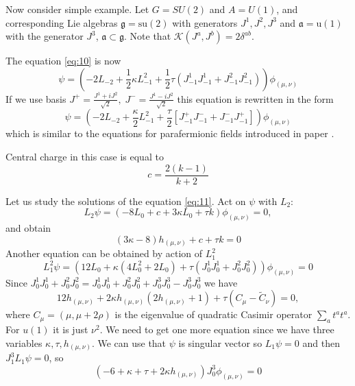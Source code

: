 \documentclass[a4paper]{article}
\theoremstyle{definition}
\newcommand{\gf}{\mathfrak{g}}
\newcommand{\af}{\mathfrak{a}}
\theoremstyle{definition} \newtheorem{Def}{Definition}
\begin{document}
Now consider simple example. Let $G=SU(2)$ and $A=U(1)$, and corresponding Lie algebras
$\gf=\mathrm{su}(2)$ with generators $J^{1},J^{2},J^{3}$ and $\af=\mathrm{u}(1)$ with the generator
$J^{3}$, $\af\subset\gf$. Note that $\mathcal{K}(J^{a},J^{b})=2\delta^{ab}$.

 The equation \eqref{eq:10} is now
\begin{equation}
  \label{eq:11} \psi=\left(-2L_{-2}+\frac{1}{2}\kappa L_{-1}^{2}+\frac{1}{2}\tau
\left(J^{1}_{-1}J^{1}_{-1}+J^{2}_{-1}J^{2}_{-1}\right)\right) \phi_{(\mu,\nu)}
\end{equation}
 If we use basis $J^{+}=\frac{J^{1}+iJ^{2}}{\sqrt{2}},\;
J^{-}=\frac{J^{1}-iJ^{2}}{\sqrt{2}}$ this equation is rewritten in the form
\begin{equation} \psi= \left(-2
L_{-2}+\frac{\kappa}{2}L_{-1}^{2}+\frac{\tau}{2}\left[J^{+}_{-1}J^{-}_{-1}+J^{-}_{-1}J^{+}_{-1}\right]\right)
\phi_{(\mu,\nu)}
\label{eq:12}
\end{equation}
 which is similar to the equations for parafermionic fields introduced in paper
\cite{santachiara2008sle}.

Central charge in this case is equal to
\begin{equation}
  \label{eq:14} c=\frac{2(k-1)}{k+2}
\end{equation}

Let us study the solutions of the equation \eqref{eq:11}. Act on $\psi$ with $L_{2}$:
\begin{equation}
  \label{eq:13} L_{2}\psi=(-8L_{0}+c+3\kappa L_{0}+\tau k)\phi_{(\mu,\nu)}=0,
\end{equation}
 and obtain
\begin{equation}
  \label{eq:28} (3\kappa-8) h_{(\mu,\nu)}+c+\tau k =0
\end{equation}
 Another equation can be obtained by action of $L_{1}^{2}$
\begin{equation}
  \label{eq:15} L_{1}^{2}\psi = (12 L_{0} + \kappa(4 L_{0}^{2}+2 L_{0}) +\tau
(J_{0}^{1}J_{0}^{1}+J_{0}^{2}J_{0}^{2}))\phi_{(\mu,\nu)}=0
\end{equation}
 Since
$J_{0}^{1}J_{0}^{1}+J_{0}^{2}J_{0}^{2}=J_{0}^{1}J_{0}^{1}+J_{0}^{2}J_{0}^{2}+J_{0}^{3}J_{0}^{3}-J_{0}^{3}J_{0}^{3}$
we have
\begin{equation}
  \label{eq:17} 12 h_{(\mu,\nu)}+2\kappa h_{(\mu,\nu)} (2h_{(\mu,\nu)}+1) + \tau
(C_{\mu}-\tilde{C}_{\nu})=0,
\end{equation}
 where $C_{\mu}=(\mu,\mu+2\rho)$ is the eigenvalue of quadratic Casimir operator
$\sum_{a}t^{a}t^{a}$. For $u(1)$ it is just $\nu^{2}$. We need to get one more equation since we
have three variables $\kappa,\tau,h_{(\mu,\nu)}$. We can use that $\psi$ is singular vector so
$L_{1}\psi=0$ and then $J_{1}^{3}L_{1}\psi=0$, so
\begin{equation}
  \label{eq:29} \left(-6 + \kappa + \tau + 2 \kappa h_{(\mu,\nu)}\right) J^{3}_{0}
\phi_{(\mu,\nu)}=0
\end{equation}
\end{document}
